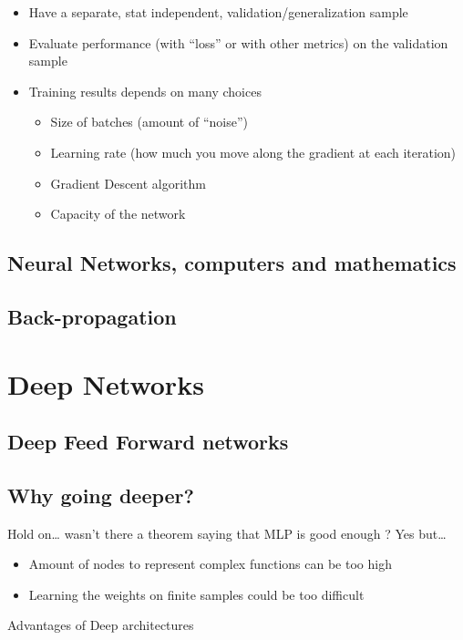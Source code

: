 \begin{itemize}
	\item Have a separate, stat independent, validation/generalization sample
	\item Evaluate performance (with “loss” or with other metrics) on the validation sample
	\item Training results depends on many choices
	\begin{itemize}
		\item Size of batches (amount of “noise”)
		\item Learning rate (how much you move along the gradient at
		each iteration)
		\item Gradient Descent algorithm
		\item Capacity of the network
	\end{itemize}
\end{itemize}

\subsection{Neural Networks, computers and mathematics}

\subsection{Back-propagation}


\section{Deep Networks}

\subsection{Deep Feed Forward networks}

\subsection{Why going deeper?}
Hold on… wasn’t there a theorem saying that MLP is good enough ? Yes but…
\begin{itemize}
	\item Amount of nodes to represent complex functions can be too high
	\item Learning the weights on finite samples could be too difficult
\end{itemize}

Advantages of Deep architectures


